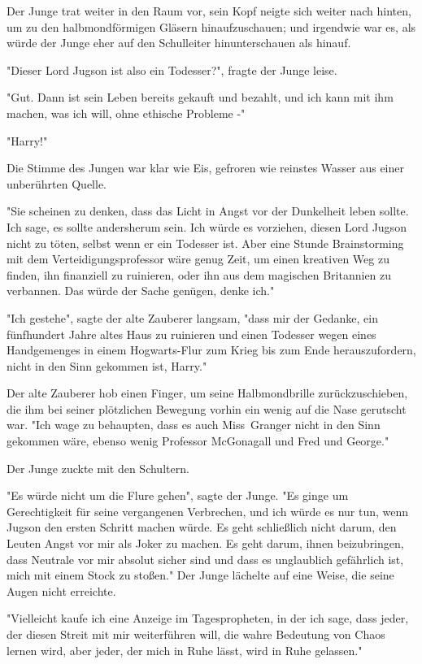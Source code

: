 {Der Junge trat weiter in den Raum vor, sein Kopf neigte sich weiter nach hinten, um zu den halbmondförmigen Gläsern hinaufzuschauen; und irgendwie war es, als würde der Junge eher auf den Schulleiter hinunterschauen als hinauf.

"Dieser Lord Jugson ist also ein Todesser?", fragte der Junge leise.

"Gut. Dann ist sein Leben bereits gekauft und bezahlt, und ich kann mit ihm machen, was ich will, ohne ethische Probleme -"

"Harry!"

Die Stimme des Jungen war klar wie Eis, gefroren wie reinstes Wasser aus einer unberührten Quelle.

"Sie scheinen zu denken, dass das Licht in Angst vor der Dunkelheit leben sollte. Ich sage, es sollte andersherum sein. Ich würde es vorziehen, diesen Lord Jugson nicht zu töten, selbst wenn er ein Todesser ist. Aber eine Stunde Brainstorming mit dem Verteidigungsprofessor wäre genug Zeit, um einen kreativen Weg zu finden, ihn finanziell zu ruinieren, oder ihn aus dem magischen Britannien zu verbannen. Das würde der Sache genügen, denke ich."

"Ich gestehe", sagte der alte Zauberer langsam, "dass mir der Gedanke, ein fünfhundert Jahre altes Haus zu ruinieren und einen Todesser wegen eines Handgemenges in einem Hogwarts-Flur zum Krieg bis zum Ende herauszufordern, nicht in den Sinn gekommen ist, Harry."

Der alte Zauberer hob einen Finger, um seine Halbmondbrille zurückzuschieben, die ihm bei seiner plötzlichen Bewegung vorhin ein wenig auf die Nase gerutscht war. "Ich wage zu behaupten, dass es auch Miss~Granger nicht in den Sinn gekommen wäre, ebenso wenig Professor McGonagall und Fred und George."

Der Junge zuckte mit den Schultern.

"Es würde nicht um die Flure gehen", sagte der Junge. "Es ginge um Gerechtigkeit für seine vergangenen Verbrechen, und ich würde es nur tun, wenn Jugson den ersten Schritt machen würde. Es geht schließlich nicht darum, den Leuten Angst vor mir als Joker zu machen. Es geht darum, ihnen beizubringen, dass Neutrale vor mir absolut sicher sind und dass es unglaublich gefährlich ist, mich mit einem Stock zu stoßen." Der Junge lächelte auf eine Weise, die seine Augen nicht erreichte.

"Vielleicht kaufe ich eine Anzeige im Tagespropheten, in der ich sage, dass jeder, der diesen Streit mit mir weiterführen will, die wahre Bedeutung von Chaos lernen wird, aber jeder, der mich in Ruhe lässt, wird in Ruhe gelassen."

}
